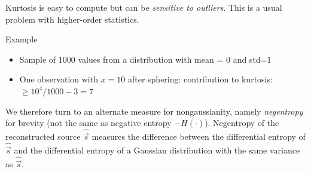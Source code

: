 
\begin{frame}
Kurtosis is easy to compute but can be \emph{sensitive to outliers}. 
This is a usual problem with higher-order statistics. 
\begin{block}{Example}
\begin{itemize}
  \item Sample of 1000 values from a distribution with mean = 0 and std=1
  \item One observation with $x=10$ after sphering:
  \itl contribution to kurtosis: $ \geq 10^4/1000 -3 = 7$
\end{itemize}
\end{block}
\end{frame}

We therefore turn to an alternate measure for nongaussianity, namely \emph{negentropy} for brevity (not the same as negative entropy $-H(\cdot)$). Negentropy of the reconstructed source $\widehat{\vec s}$ measures the difference between the differential entropy of $\widehat{\vec s}$ and the differential entropy of a Gaussian distribution with the same variance as $\widehat{\vec s}$.

